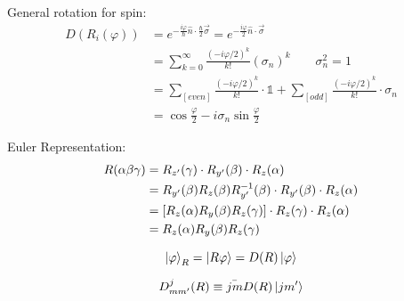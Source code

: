 General rotation for spin:
\begin{equation}
    \begin{aligned}
	D(R_i(\varphi)) &= e^{-\frac{i\varphi}{\hbar}\hat{n}\cdot\frac{\hbar}{2}\vec{\sigma}} = e^{-\frac{i\varphi}{2}\hat{n}\cdot\vec{\sigma}} \\
	&= \displaystyle \sum_{k=0}^{\infty}\frac{(-i\varphi/2)^k}{k!}(\sigma_n)^k   \qquad  \sigma_n^2=1    \\
	&= \displaystyle \sum_{[even]}\frac{(-i\varphi/2)^k}{k!}\cdot\mathds{1} + \displaystyle \sum_{[odd]}\frac{(-i\varphi/2)^k}{k!}\cdot\sigma_n \\
	&= \cos\frac{\varphi}{2} -i\sigma_n\sin\frac{\varphi}{2}
    \end{aligned}
\end{equation}

Euler Representation:
\begin{equation}
    \begin{aligned}
    R(\alpha\beta\gamma) &= R_{z'}(\gamma)\cdot R_{y'}(\beta)\cdot R_{z}(\alpha)	\\
	    &= R_{y'}(\beta)R_z(\beta)R_{y'}^{-1}(\beta)\cdot R_{y'}(\beta)\cdot R_z(\alpha)	\\
	    &= [R_{z}(\alpha)R_y(\beta)R_{z}(\gamma)]\cdot R_{z}(\gamma)\cdot R_z(\alpha)	\\
	    &= R_z(\alpha)R_y(\beta)R_z(\gamma)	\\
    \end{aligned}
\end{equation}

\begin{equation}
    \ket{\varphi}_R = \ket{R\varphi} = D(R)\ket{\varphi}
\end{equation}

\begin{equation}
    D^{j}_{mm'}(R) \equiv \bar{jm}D(R)\ket{jm'}
\end{equation}

